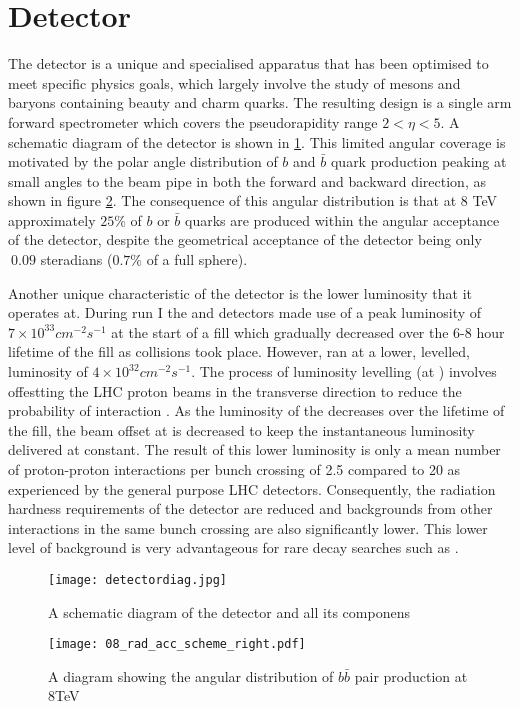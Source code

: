 
\section{Detector}
\label{sec:Detector}

The \lhcb detector is a unique and specialised apparatus that has been optimised to meet specific physics goals, which largely involve the study of mesons and baryons containing beauty and charm quarks.  The resulting design is a single arm forward spectrometer which covers the pseudorapidity range $2 < \eta < 5$.  A schematic diagram of the detector is shown in \ref{fig:detectdiag}.  This limited angular coverage is motivated by the polar angle distribution of  $b$ and $\bar{b}$ quark production peaking at small angles to the beam pipe in both the forward and backward direction, as shown in figure \ref{fig:bbarprod}.  The consequence of this angular distribution is that at 8 TeV approximately $25\%$ of $b$ or $\bar{b}$ quarks are produced within the angular acceptance of the \lhcb detector, despite the geometrical acceptance of the detector being only $~0.09$ steradians ($0.7\%$ of a full sphere).

Another unique characteristic of the \lhcb detector is the lower luminosity that it operates at.  During run I the \atlas and \cms detectors made use of a peak luminosity of $7\times 10^{33}cm^{-2}s^{-1}$ at the start of a fill which gradually decreased over the 6-8 hour lifetime of the fill as collisions took place.  However, \lhcb ran at a lower, levelled, luminosity of $4\times 10^{32}cm^{-2}s^{-1}$.  The process of luminosity levelling (at \lhcb) involves offestting the LHC proton beams in the transverse direction to reduce the probability of interaction \cite{Follin:2014nva}. As the luminosity of the \lhc decreases over the lifetime of the fill, the beam offset at \lhcb is decreased to keep the instantaneous luminosity delivered at \lhcb constant.  The result of this lower luminosity is only a mean number of proton-proton interactions per bunch crossing of 2.5 compared to 20 as experienced by the general purpose LHC detectors.  Consequently, the radiation hardness requirements of the \lhcb detector are reduced and backgrounds from other interactions in the same bunch crossing are also significantly lower.  This lower level of background is very advantageous for rare decay searches such as \Bz \to \muon \muon.
\begin{figure}[h]
  \centering
  \texttt{[image: detectordiag.jpg]}
  \caption{ A schematic diagram of the \lhcb detector and all its componens}
  \label{fig:detectdiag}
\end{figure}
\begin{figure}[h]
  \centering
  \texttt{[image: 08\_rad\_acc\_scheme\_right.pdf]}
  \caption{A diagram showing the angular distribution of $b \bar{b}$ pair production at 8TeV}
  \label{fig:bbarprod}
\end{figure}
